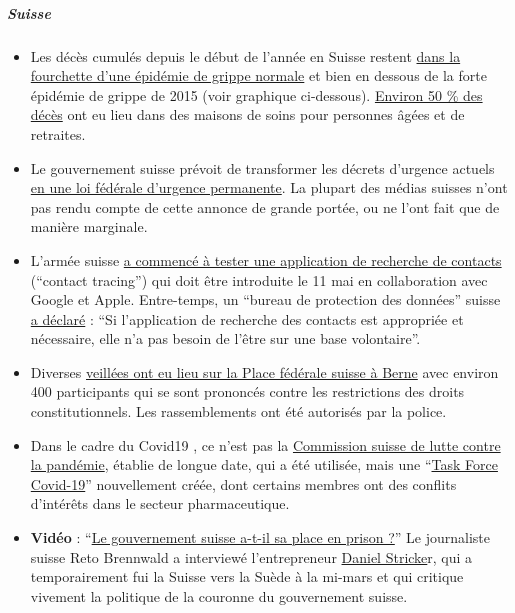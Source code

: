 \hypertarget{suisse-1}{%
\subparagraph{\texorpdfstring{\textbf{Suisse}}{Suisse}}\label{suisse-1}}

\begin{itemize}
\tightlist
\item
  Les décès cumulés depuis le début de l'année en Suisse restent
  \href{https://swprs.files.wordpress.com/2020/05/schweiz-todesfaelle-2010-2020_woche_17.pdf}{dans
  la fourchette d'une épidémie de grippe normale} et bien en dessous de
  la forte épidémie de grippe de 2015 (voir graphique ci-dessous).
  \href{https://www.bluewin.ch/de/news/schweiz/sp-chef-levrat-will-die-reichen-schropfen-383977.html}{Environ
  50 \% des décès} ont eu lieu dans des maisons de soins pour personnes
  âgées et de retraites.
\item
  Le gouvernement suisse prévoit de transformer les décrets d'urgence
  actuels
  \href{https://www.admin.ch/gov/de/start/dokumentation/medienmitteilungen.msg-id-78929.html}{en
  une loi fédérale d'urgence permanente}. La plupart des médias suisses
  n'ont pas rendu compte de cette annonce de grande portée, ou ne l'ont
  fait que de manière marginale.
\item
  L'armée suisse
  \href{https://uncut-news.ch/wp-content/uploads/2020/05/Schweizer-Soldaten-k\%C3\%A4mpfen-bewaffnet-mit-Bluetooth-App-gegen-COVID-19.pdf}{a
  commencé à tester une application de recherche de contacts} (``contact
  tracing'') qui doit être introduite le 11 mai en collaboration avec
  Google et Apple. Entre-temps, un ``bureau de protection des données''
  suisse
  \href{https://www.nzz.ch/zuerich/coronavirus-in-zuerich-tracing-app-braucht-keine-freiwilligkeit-ld.1553964}{a
  déclaré} : ``Si l'application de recherche des contacts est appropriée
  et nécessaire, elle n'a pas besoin de l'être sur une base
  volontaire''.
\item
  Diverses
  \href{https://www.zeitpunkt.ch/index.php/mahnwache-fuer-grundrechte-400-menschen-auf-dem-bundesplatz-wie-aus-dem-nichts}{veillées
  ont eu lieu sur la Place fédérale suisse à Berne} avec environ 400
  participants qui se sont prononcés contre les restrictions des droits
  constitutionnels. Les rassemblements ont été autorisés par la police.
\item
  Dans le cadre du Covid19 , ce n'est pas la
  \href{https://www.srf.ch/news/schweiz/bag-verzichtete-auf-beratung-was-macht-die-pandemie-kommission-in-der-krise}{Commission
  suisse de lutte contre la pandémie}, établie de longue date, qui a été
  utilisée, mais une ``\href{https://ncs-tf.ch/de/organisation}{Task
  Force Covid-19}'' nouvellement créée, dont certains membres ont des
  conflits d'intérêts dans le secteur pharmaceutique.
\item
  \textbf{Vidéo} :
  ``\href{https://www.youtube.com/watch?v=RyZGkdeQ6CY}{Le gouvernement
  suisse a-t-il sa place en prison ?}'' Le journaliste suisse Reto
  Brennwald a interviewé l'entrepreneur
  \href{https://www.youtube.com/user/timturpis/videos}{Daniel Stricke}r,
  qui a temporairement fui la Suisse vers la Suède à la mi-mars et qui
  critique vivement la politique de la couronne du gouvernement suisse.
\end{itemize}

